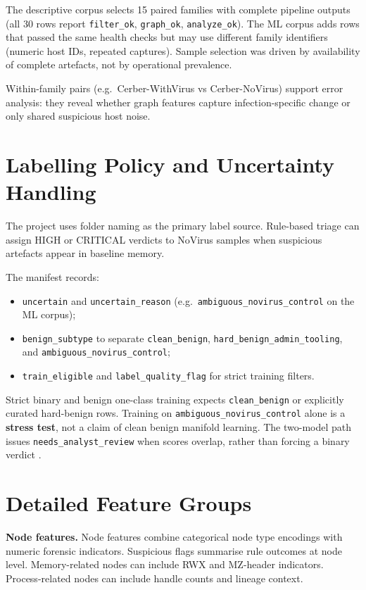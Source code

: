 The descriptive corpus selects 15 paired families with complete pipeline outputs (all 30 rows report \texttt{filter\_ok}, \texttt{graph\_ok}, \texttt{analyze\_ok}). The ML corpus adds rows that passed the same health checks but may use different family identifiers (numeric host IDs, repeated captures). Sample selection was driven by availability of complete artefacts, not by operational prevalence.

Within-family pairs (e.g.\ Cerber-WithVirus vs Cerber-NoVirus) support error analysis: they reveal whether graph features capture infection-specific change or only shared suspicious host noise.

\section{Labelling Policy and Uncertainty Handling}

The project uses folder naming as the primary label source. Rule-based triage can assign HIGH or CRITICAL verdicts to NoVirus samples when suspicious artefacts appear in baseline memory.

The manifest records:
\begin{itemize}
\item \texttt{uncertain} and \texttt{uncertain\_reason} (e.g.\ \texttt{ambiguous\_novirus\_control} on the ML corpus);
\item \texttt{benign\_subtype} to separate \texttt{clean\_benign}, \texttt{hard\_benign\_admin\_tooling}, and \texttt{ambiguous\_novirus\_control};
\item \texttt{train\_eligible} and \texttt{label\_quality\_flag} for strict training filters.
\end{itemize}

Strict binary and benign one-class training expects \texttt{clean\_benign} or explicitly curated hard-benign rows. Training on \texttt{ambiguous\_novirus\_control} alone is a \textbf{stress test}, not a claim of clean benign manifold learning. The two-model path issues \texttt{needs\_analyst\_review} when scores overlap, rather than forcing a binary verdict \cite{goodman2016reproducibility}.

\section{Detailed Feature Groups}

\textbf{Node features.} Node features combine categorical node type encodings with numeric forensic indicators. Suspicious flags summarise rule outcomes at node level. Memory-related nodes can include RWX and MZ-header indicators. Process-related nodes can include handle counts and lineage context.

